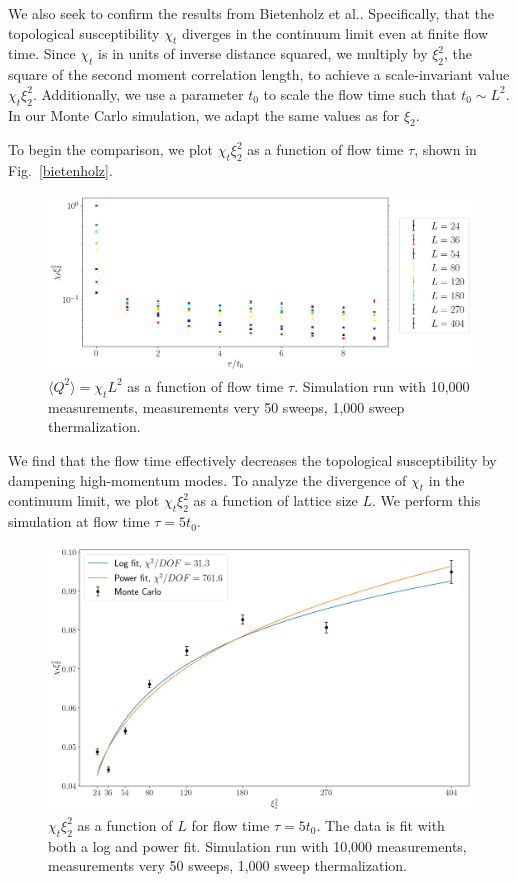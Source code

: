 \documentclass[12pt]{report}
\begin{document}
We also seek to confirm the results from Bietenholz et al.\cite{bietenholz2018}. Specifically, that the topological susceptibility $\chi_t$ diverges in the continuum limit even at finite flow time. Since $\chi_t$ is in units of inverse distance squared, we multiply by $\xi_2^2$, the square of the second moment correlation length, to achieve a scale-invariant value $\chi_t\xi_2^2$. Additionally, we use a parameter $t_0$ to scale the flow time such that $t_0\sim L^2$. In our Monte Carlo simulation, we adapt the same values as \cite{bietenholz2018} for $\xi_2$.

To begin the comparison, we plot $\chi_t\xi_2^2$ as a function of flow time $\tau$, shown in Fig.~\ref{bietenholz}.
\begin{figure}[h]
    \centering
      \includegraphics[width=\textwidth]{imgs/bietenholz.png}
      \caption{\label{fig:bietenholz} $\langle Q^2 \rangle=\chi_t L^2$ as a  function of flow time $\tau$. Simulation run with 10,000 measurements, measurements very 50 sweeps, 1,000 sweep thermalization.}
\end{figure}
We find that the flow time effectively decreases the topological susceptibility by dampening high-momentum modes. To analyze the divergence of $\chi_t$ in the continuum limit, we plot $\chi_t \xi_2^2$ as a function of lattice size $L$. We perform this simulation at flow time $\tau=5t_0$.
\begin{figure}[h]
    \centering
      \includegraphics[width=\textwidth]{imgs/divergence.png}
      \caption{\label{fig:bietenholz} $\chi_t\xi_2^2$ as a function of $L$ for flow time $\tau=5t_0$. The data is fit with both a log and power fit. Simulation run with 10,000 measurements, measurements very 50 sweeps, 1,000 sweep thermalization.}
\end{figure}
\end{document}

